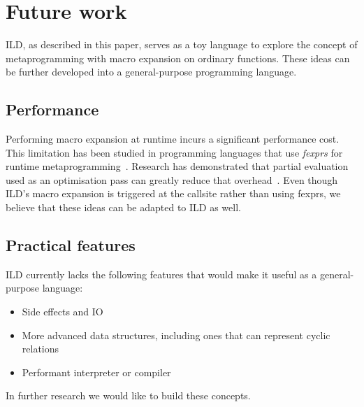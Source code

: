 \section{Future work}
\label{future-work}
ILD, as described in this paper, serves as a toy language to explore
the concept of metaprogramming with macro expansion on ordinary functions.
These ideas can be further developed into a general-purpose programming language.
\subsection{Performance}
Performing macro expansion at runtime incurs a significant performance cost.
This limitation has been studied in programming languages that use \emph{fexprs}
for runtime metaprogramming~\cite{kernel-report}. Research has demonstrated
that partial evaluation used as an optimisation pass can greatly reduce that
overhead~\cite{fexpr-pe}. Even though ILD's macro expansion is triggered at the
callsite rather than using fexprs, we believe that these ideas can be adapted
to ILD as well.
\subsection{Practical features}
ILD currently lacks the following features that would make it useful as
a general-purpose language:
\begin{itemize}
\item Side effects and IO
\item More advanced data structures, including ones that can represent cyclic relations
\item Performant interpreter or compiler
\end{itemize}
In further research we would like to build these concepts.
